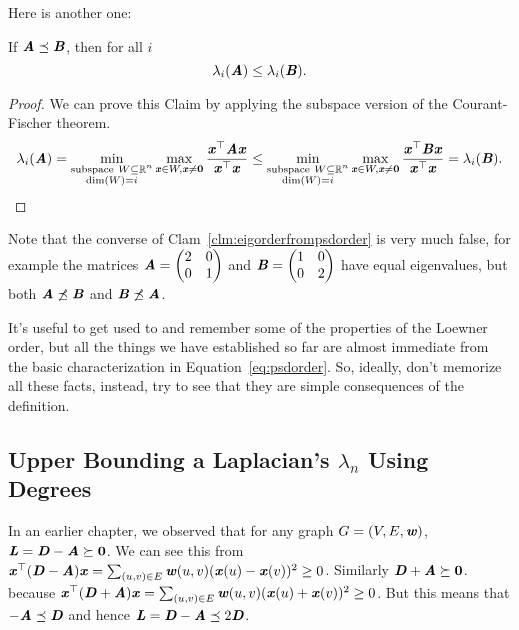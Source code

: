 Here is another one:
\begin{claim}
  \label{clm:eigorderfrompsdorder}
If $\AA \preceq \BB$, then for all $i$
\[
\lambda_i(\AA) \leq \lambda_i(\BB).
\]
\end{claim}
\begin{proof}
  We can prove this Claim by applying the subspace version of the
  Courant-Fischer theorem.
\[
\lambda_i(\AA) =
\min_{
      \substack{
        \mathrm{subspace~} W \subseteq \R^n
        \\
        \dim{W} = i
      }
    }
    \max_{
      \xx \in W, \xx \neq \veczero
    }
    \frac{\xx^\trp \AA\xx}{\xx^\trp\xx}
\leq
 \min_{
      \substack{
        \mathrm{subspace~} W \subseteq \R^n
        \\
        \dim{W} = i
      }
    }
    \max_{
      \xx \in W, \xx \neq \veczero
    }
    \frac{\xx^\trp \BB\xx}{\xx^\trp\xx}
= \lambda_i(\BB).
\]
\end{proof}
Note that the converse of Clam~\ref{clm:eigorderfrompsdorder} is very
much false, for example the matrices
$ \AA =
\begin{pmatrix}
  2 & 0 \\
  0 & 1
\end{pmatrix}$
and $\BB = \begin{pmatrix}
  1 & 0 \\
  0 & 2
\end{pmatrix}$ have equal eigenvalues, but both $\AA \not\preceq \BB$ and
$\BB \not\preceq \AA$.

\begin{remark}
  It's useful to get used to and remember some of the properties of the Loewner
  order, but all the things we have established so far are almost
  immediate from the basic characterization in
  Equation~\eqref{eq:psdorder}.
  So, ideally, don't memorize all these facts, instead, try to see that
  they are simple consequences of the definition.
\end{remark}

\subsection{Upper Bounding a Laplacian's $\lambda_n$ Using Degrees}
In an earlier chapter, we observed that for any graph $G=(V,E,\ww)$,
$\LL = \DD - \AA \succeq \matzero$.
We can see this from
$\xx^\top (\DD-\AA) \xx = \sum_{ (u,v) \in E } \ww(u,v)
( \xx(u) - \xx(v) )^2 \geq 0$.
Similarly $\DD + \AA \succeq \matzero$. because
$\xx^\top (\DD+\AA) \xx = \sum_{ (u,v) \in E } \ww(u,v)
( \xx(u) + \xx(v) )^2 \geq 0$.
But this means that $-\AA \preceq \DD$ and hence $\LL = \DD-\AA
\preceq 2\DD$.

